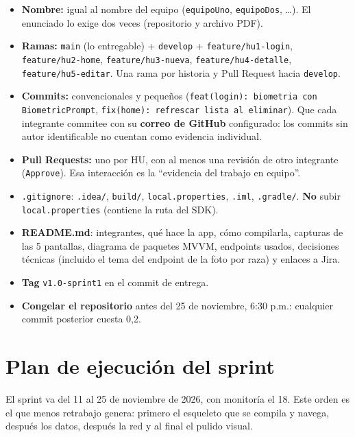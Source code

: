 \documentclass[11pt,letterpaper]{article}
\newcommand{\code}[1]{\texttt{\small #1}}
\begin{document}
\begin{itemize}[leftmargin=1.4em,itemsep=3pt]
  \item \textbf{Nombre:} igual al nombre del equipo (\code{equipoUno},
        \code{equipoDos}, \ldots). El enunciado lo exige dos veces (repositorio y
        archivo PDF).
  \item \textbf{Ramas:} \code{main} (lo entregable) + \code{develop} +
        \code{feature/\allowbreak{}hu1-login}, \code{feature/\allowbreak{}hu2-home},
        \code{feature/\allowbreak{}hu3-nueva}, \code{feature/\allowbreak{}hu4-detalle},
        \code{feature/\allowbreak{}hu5-editar}. Una rama por historia y Pull Request hacia
        \code{develop}.
  \item \textbf{Commits:} convencionales y peque\~nos
        (\code{feat(login):\allowbreak{} biometria con BiometricPrompt},
        \code{fix(home): refrescar lista al eliminar}). Que cada integrante
        commitee con su \textbf{correo de GitHub} configurado: los commits sin
        autor identificable no cuentan como evidencia individual.
  \item \textbf{Pull Requests:} uno por HU, con al menos una revisi\'on de otro
        integrante (\code{Approve}). Esa interacci\'on es la ``evidencia del
        trabajo en equipo''.
  \item \code{.gitignore}: \code{.idea/}, \code{build/}, \code{local.properties},
        \code{*.iml}, \code{.gradle/\allowbreak{}}. \textbf{No} subir \code{local.properties}
        (contiene la ruta del SDK).
  \item \textbf{README.md}: integrantes, qu\'e hace la app, c\'omo compilarla,
        capturas de las 5 pantallas, diagrama de paquetes MVVM, endpoints
        usados, decisiones t\'ecnicas (incluido el tema del endpoint de la foto
        por raza) y enlaces a Jira.
  \item \textbf{Tag} \code{v1.0-sprint1} en el commit de entrega.
  \item \textbf{Congelar el repositorio} antes del 25 de noviembre, 6:30 p.m.:
        cualquier commit posterior cuesta 0,2.
\end{itemize}

\section{Plan de ejecuci\'on del sprint}

El sprint va del 11 al 25 de noviembre de 2026, con monitor\'ia el 18. Este orden
es el que menos retrabajo genera: primero el esqueleto que se compila y navega,
despu\'es los datos, despu\'es la red y al final el pulido visual.
\end{document}
